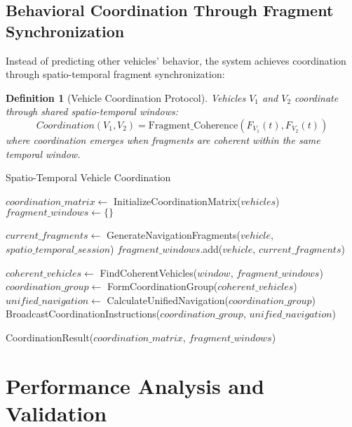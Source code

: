 \documentclass[12pt,a4paper]{article}
\newtheorem{definition}[theorem]{Definition}
\begin{document}
\subsection{Behavioral Coordination Through Fragment Synchronization}

Instead of predicting other vehicles' behavior, the system achieves coordination through spatio-temporal fragment synchronization:

\begin{definition}[Vehicle Coordination Protocol]
Vehicles $V_1$ and $V_2$ coordinate through shared spatio-temporal windows:
\begin{equation}
Coordination(V_1, V_2) = \text{Fragment\_Coherence}(F_{V_1}(t), F_{V_2}(t))
\end{equation}
where coordination emerges when fragments are coherent within the same temporal window.
\end{definition}

\begin{algorithm}
\caption{Spatio-Temporal Vehicle Coordination}
\begin{algorithmic}
    \State $coordination\_matrix \gets$ InitializeCoordinationMatrix($vehicles$)
    \State $fragment\_windows \gets \{\}$
    
        \State $current\_fragments \gets$ GenerateNavigationFragments($vehicle$, $spatio\_temporal\_session$)
        \State $fragment\_windows$.add($vehicle$, $current\_fragments$)
    \EndFor
    
        \State $coherent\_vehicles \gets$ FindCoherentVehicles($window$, $fragment\_windows$)
        \State $coordination\_group \gets$ FormCoordinationGroup($coherent\_vehicles$)
        \State $unified\_navigation \gets$ CalculateUnifiedNavigation($coordination\_group$)
        \State BroadcastCoordinationInstructions($coordination\_group$, $unified\_navigation$)
    \EndFor
    
    \State \Return CoordinationResult($coordination\_matrix$, $fragment\_windows$)
\EndProcedure
\end{algorithmic}
\end{algorithm}

\section{Performance Analysis and Validation}
\end{document}
